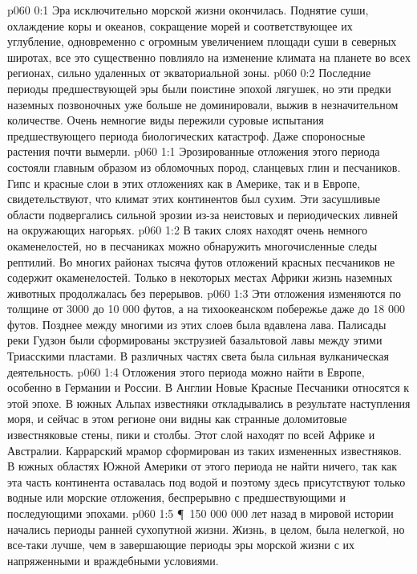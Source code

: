 \author{Носитель Жизни}
\vs p060 0:1 Эра исключительно морской жизни окончилась. Поднятие суши, охлаждение коры и океанов, сокращение морей и соответствующее их углубление, одновременно с огромным увеличением площади суши в северных широтах, все это существенно повлияло на изменение климата на планете во всех регионах, сильно удаленных от экваториальной зоны.
\vs p060 0:2 Последние периоды предшествующей эры были поистине эпохой лягушек, но эти предки наземных позвоночных уже больше не доминировали, выжив в незначительном количестве. Очень немногие виды пережили суровые испытания предшествующего периода биологических катастроф. Даже спороносные растения почти вымерли.
\vs p060 1:1 Эрозированные отложения этого периода состояли главным образом из обломочных пород, сланцевых глин и песчаников. Гипс и красные слои в этих отложениях как в Америке, так и в Европе, свидетельствуют, что климат этих континентов был сухим. Эти засушливые области подвергались сильной эрозии из\hyp{}за неистовых и периодических ливней на окружающих нагорьях.
\vs p060 1:2 В таких слоях находят очень немного окаменелостей, но в песчаниках можно обнаружить многочисленные следы рептилий. Во многих районах тысяча футов отложений красных песчаников не содержит окаменелостей. Только в некоторых местах Африки жизнь наземных животных продолжалась без перерывов.
\vs p060 1:3 Эти отложения изменяются по толщине от 3000 до 10 000 футов, а на тихоокеанском побережье даже до 18 000 футов. Позднее между многими из этих слоев была вдавлена лава. Палисады реки Гудзон были сформированы экструзией базальтовой лавы между этими Триасскими пластами. В различных частях света была сильная вулканическая деятельность.
\vs p060 1:4 Отложения этого периода можно найти в Европе, особенно в Германии и России. В Англии Новые Красные Песчаники относятся к этой эпохе. В южных Альпах известняки откладывались в результате наступления моря, и сейчас в этом регионе они видны как странные доломитовые известняковые стены, пики и столбы. Этот слой находят по всей Африке и Австралии. Каррарский мрамор сформирован из таких измененных известняков. В южных областях Южной Америки от этого периода не найти ничего, так как эта часть континента оставалась под водой и поэтому здесь присутствуют только водные или морские отложения, беспрерывно с предшествующими и последующими эпохами.
\vs p060 1:5 \P\ 150 000 000 лет назад в мировой истории начались периоды ранней сухопутной жизни. Жизнь, в целом, была нелегкой, но все\hyp{}таки лучше, чем в завершающие периоды эры морской жизни с их напряженными и враждебными условиями.
